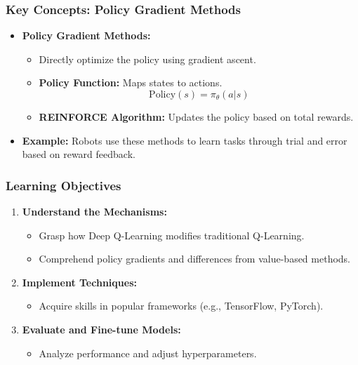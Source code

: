 \documentclass[aspectratio=169]{beamer}
\begin{document}
\begin{frame}[fragile]
    \frametitle{Key Concepts: Policy Gradient Methods}
    \begin{itemize}
        \item \textbf{Policy Gradient Methods:}
        \begin{itemize}
            \item Directly optimize the policy using gradient ascent.
            \item \textbf{Policy Function:} Maps states to actions.
            \begin{equation}
                \text{Policy}(s) = \pi_\theta(a|s)
            \end{equation}
            \item \textbf{REINFORCE Algorithm:} Updates the policy based on total rewards.
        \end{itemize}
        \item \textbf{Example:} Robots use these methods to learn tasks through trial and error based on reward feedback.
    \end{itemize}
\end{frame}

\begin{frame}[fragile]
    \frametitle{Learning Objectives}
    \begin{enumerate}
        \item \textbf{Understand the Mechanisms:}
        \begin{itemize}
            \item Grasp how Deep Q-Learning modifies traditional Q-Learning.
            \item Comprehend policy gradients and differences from value-based methods.
        \end{itemize}
        \item \textbf{Implement Techniques:}
        \begin{itemize}
            \item Acquire skills in popular frameworks (e.g., TensorFlow, PyTorch).
        \end{itemize}
        \item \textbf{Evaluate and Fine-tune Models:}
        \begin{itemize}
            \item Analyze performance and adjust hyperparameters.
        \end{itemize}
    \end{enumerate}
\end{frame}
\end{document}
